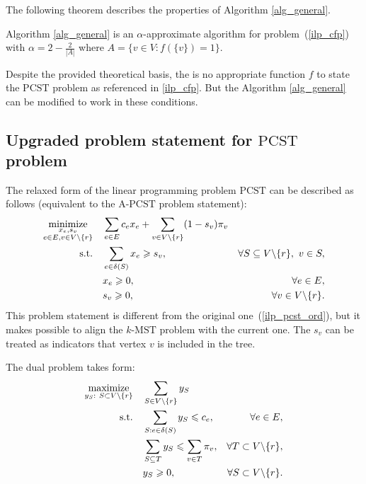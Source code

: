 \documentclass[11pt, tightenlines, twoside, onecolumn, nofloats, nobibnotes, nofootinbib, superscriptaddress, noshowpacks, centertags]{revtex4}
\begin{document}

The following theorem describes the properties of Algorithm \ref{alg_general}.

\begin{theorem}
    Algorithm \ref{alg_general} is an $\alpha$-approximate algorithm for problem~(\ref{ilp_cfp}) with $\alpha = 2 - \frac{2}{|A|}$ where $A=\{v\in V: f(\{v\})=1\}$.
    \label{theorem2}
\end{theorem}

Despite the provided theoretical basis, the is no appropriate function $f$ to state the $\text{PCST}$ problem as referenced in \ref{ilp_cfp}. But the Algorithm \ref{alg_general} can be modified to work in these conditions.

\subsection{Upgraded problem statement for $\text{PCST}$ problem}

The relaxed form of the linear programming problem $\text{PCST}$ can be described as follows (equivalent to the $\text{A}$-$\text{PCST}$ problem statement):
\begin{align}
\underset{\substack{x_e,s_v \\ e\in E, v\in V\backslash \{r\}}}{\text{minimize}}\quad & \sum\limits_{e\in E}c_ex_e +  \sum\limits_{v\in V\backslash\{r\}}(1-s_v)\pi_v \nonumber\\
\text{s.t.\quad} & \sum\limits_{e\in\delta(S)}x_e\geqslant s_v, & \forall S\subseteq V\backslash \{r\},~v\in S,\label{rlp_pcst_inord}\\
& x_e\geqslant 0, &\forall e\in E,\nonumber\\
& s_v\geqslant 0, &\forall v\in V\backslash \{r\}.\nonumber
\end{align}
This problem statement is different from the original one~(\ref{ilp_pcst_ord}), but it makes possible to align the $k\text{-MST}$ problem with the current one. The $s_v$ can be treated as indicators that vertex $v$ is included in the tree.

The dual problem takes form:
\begin{align}
\underset{\substack{y_S:~S\subset V\backslash\{r\}}}{\text{maximize}}\quad & \sum\limits_{S\in V\backslash\{r\}}y_S \nonumber\\
\text{s.t.\quad} & \sum\limits_{S:e\in\delta(S)}y_S\leqslant c_e , & \forall e\in E,\label{rd_pcst_inord}\\
& \sum\limits_{S\subseteq T}y_S\leqslant \sum\limits_{v\in T}\pi_v, &\forall T\subset V\backslash\{r\},\nonumber\\
& y_S\geqslant 0, &\forall S\subset V\backslash\{r\}.\nonumber
\end{align}
\end{document}
